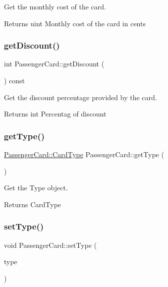 Get the monthly cost of the card. 

\begin{DoxyReturn}{Returns}
uint Monthly cost of the card in cents 
\end{DoxyReturn}
\mbox{\label{classPassengerCard_a62d2651d233d28643d5e0863500c42c4}} 
\subsubsection{\texorpdfstring{get\+Discount()}{getDiscount()}}
{\footnotesize\ttfamily int Passenger\+Card\+::get\+Discount (\begin{DoxyParamCaption}{ }\end{DoxyParamCaption}) const}



Get the discount percentage provided by the card. 

\begin{DoxyReturn}{Returns}
int Percentag of discount 
\end{DoxyReturn}
\mbox{\label{classPassengerCard_aef682e4bb625ac937c4aec7999c92626}} 
\subsubsection{\texorpdfstring{get\+Type()}{getType()}}
{\footnotesize\ttfamily \mbox{\hyperlink{classPassengerCard_ac30388c823af514403463a797e2878af}{Passenger\+Card\+::\+Card\+Type}} Passenger\+Card\+::get\+Type (\begin{DoxyParamCaption}{ }\end{DoxyParamCaption})}



Get the Type object. 

\begin{DoxyReturn}{Returns}
Card\+Type 
\end{DoxyReturn}
\mbox{\label{classPassengerCard_ab0c4c67f185dc1abee907b6cd50413bf}} 
\subsubsection{\texorpdfstring{set\+Type()}{setType()}}
{\footnotesize\ttfamily void Passenger\+Card\+::set\+Type (\begin{DoxyParamCaption}\item[{\mbox{\hyperlink{classPassengerCard_ac30388c823af514403463a797e2878af}{Card\+Type}}}]{type }\end{DoxyParamCaption})}




